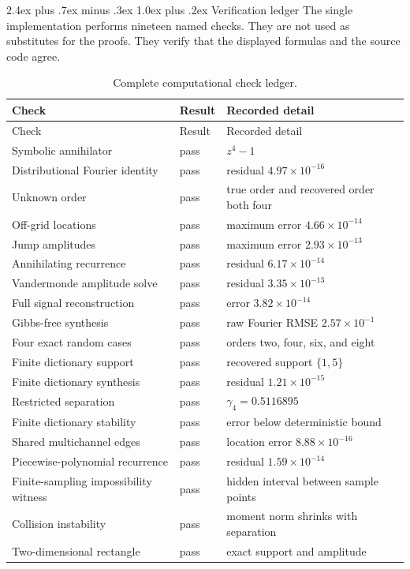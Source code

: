 \documentclass[11pt,oneside]{book}
\makeatletter
\renewcommand\chapter{\@startsection{chapter}{0}{\z@}%
  {2.4ex plus .7ex minus .3ex}%
  {1.0ex plus .2ex}%
  {\normalfont\LARGE\bfseries\color{Ink}}}
\theoremstyle{remark}
\makeatother
\begin{document}
\chapter{Verification ledger}
The single implementation performs nineteen named checks. They are not used as substitutes for the proofs. They verify that the displayed formulas and the source code agree.

\begin{longtable}{L{0.43\textwidth}L{0.12\textwidth}L{0.35\textwidth}}
\caption{Complete computational check ledger.}\label{tab:tests}\\
\toprule
Check & Result & Recorded detail\\
\midrule
\endfirsthead
\toprule
Check & Result & Recorded detail\\
\midrule
\endhead
Symbolic annihilator & pass & \(z^4-1\)\\
Distributional Fourier identity & pass & residual \(4.97\times10^{-16}\)\\
Unknown order & pass & true order and recovered order both four\\
Off-grid locations & pass & maximum error \(4.66\times10^{-14}\)\\
Jump amplitudes & pass & maximum error \(2.93\times10^{-13}\)\\
Annihilating recurrence & pass & residual \(6.17\times10^{-14}\)\\
Vandermonde amplitude solve & pass & residual \(3.35\times10^{-13}\)\\
Full signal reconstruction & pass & error \(3.82\times10^{-14}\)\\
Gibbs-free synthesis & pass & raw Fourier RMSE \(2.57\times10^{-1}\)\\
Four exact random cases & pass & orders two, four, six, and eight\\
Finite dictionary support & pass & recovered support \(\{1,5\}\)\\
Finite dictionary synthesis & pass & residual \(1.21\times10^{-15}\)\\
Restricted separation & pass & \(\gamma_4=0.5116895\)\\
Finite dictionary stability & pass & error below deterministic bound\\
Shared multichannel edges & pass & location error \(8.88\times10^{-16}\)\\
Piecewise-polynomial recurrence & pass & residual \(1.59\times10^{-14}\)\\
Finite-sampling impossibility witness & pass & hidden interval between sample points\\
Collision instability & pass & moment norm shrinks with separation\\
Two-dimensional rectangle & pass & exact support and amplitude\\
\bottomrule
\end{longtable}
\end{document}
